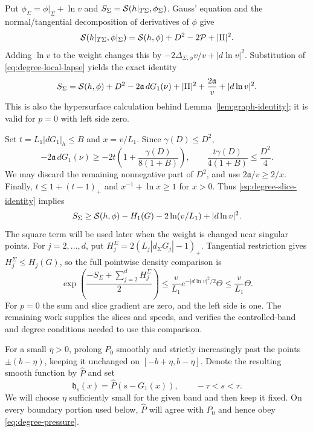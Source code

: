 Put $\phi_\Sigma=\phi|_\Sigma+\ln v$ and
$S_\Sigma=\mathcal S(h|_{T\Sigma},\phi_\Sigma)$.  Gauss' equation and the
normal/tangential decomposition of derivatives of $\phi$ give
\[
 \mathcal S(h|_{T\Sigma},\phi|_\Sigma)
       =\mathcal S(h,\phi)+D^2-2\mathcal P+|\mathrm{II}|^2.
\]
Adding $\ln v$ to the weight changes this by
$-2\Delta_{\Sigma,\phi}v/v+|d\ln v|^2$.  Substitution of
\eqref{eq:degree-local-lapse} yields the exact identity
\begin{equation}\label{eq:degree-slice-identity}
 S_\Sigma=\mathcal S(h,\phi)+D^2-2\mathfrak a\,dG_1(\nu)
                 +|\mathrm{II}|^2+\frac{2\mathfrak a}{v}+|d\ln v|^2.
\end{equation}
This is also the hypersurface calculation behind
Lemma~\ref{lem:graph-identity}; it is valid for $p=0$ with left side zero.

Set $t=L_1|dG_1|_h\le B$ and $x=v/L_1$.  Since $\gamma(D)\le D^2$,
\[
 -2\mathfrak a\,dG_1(\nu)
       \ge-2t\left(1+\frac{\gamma(D)}{8(1+B)}\right),
 \qquad \frac{t\gamma(D)}{4(1+B)}\le\frac{D^2}{4}.
\]
We may discard the remaining nonnegative part of $D^2$, and use
$2\mathfrak a/v\ge2/x$.  Finally,
$t\le1+(t-1)_+$ and $x^{-1}+\ln x\ge1$ for $x>0$.  Thus
\eqref{eq:degree-slice-identity} implies
\begin{equation}\label{eq:degree-slice-bound}
 S_\Sigma\ge\mathcal S(h,\phi)-H_1(G)-2\ln(v/L_1)+|d\ln v|^2.
\end{equation}
The square term will be used later when the weight is changed near
singular points.  For $j=2,\ldots,d$, put
$H_j^\Sigma=2(L_j|d_\Sigma G_j|-1)_+$.  Tangential restriction gives
$H_j^\Sigma\le H_j(G)$, so the full pointwise density comparison is
\begin{equation}\label{eq:degree-raw-integrand}
 \exp\left(\frac{-S_\Sigma+\sum_{j=2}^dH_j^\Sigma}{2}\right)
 \le\frac v{L_1}e^{-|d\ln v|^2/2}\Theta
 \le\frac v{L_1}\Theta.
\end{equation}
For $p=0$ the sum and slice gradient are zero, and the left side is one.
The remaining work supplies the slices and speeds, and verifies the
controlled-band and degree conditions needed to use this comparison.

For a small $\eta>0$, prolong $P_0$ smoothly and strictly increasingly
past the points $\pm(b-\eta)$, keeping it unchanged on
$[-b+\eta,b-\eta]$.  Denote the resulting smooth function by
$\widehat P$ and set
\[
                \mathfrak h_s(x)=\widehat P(s-G_1(x)),\qquad -\tau<s<\tau.
\]
We will choose $\eta$ sufficiently small for the given band and then keep
it fixed.  On every boundary portion used below, $\widehat P$ will agree
with $P_0$ and hence obey \eqref{eq:degree-pressure}.

